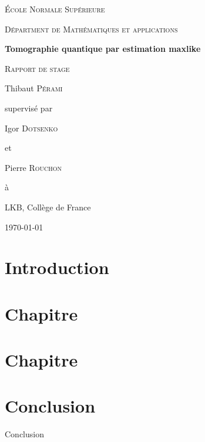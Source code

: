 \documentclass[10pt]{report}
\begin{document}
\begin{titlepage}
  \centering
  {\scshape\huge École Normale Supérieure \par}
  \vspace{0.3cm}
  {\scshape\Large Départment de Mathématiques et applications \par}
  \vspace{3cm}
  {\Huge\bfseries Tomographie quantique par estimation maxlike \par}
  \vspace{0.5cm}
  {\scshape\Large Rapport de stage\par}
  \vspace{3cm}
  {\LARGE Thibaut \textsc{Pérami}\par}
  \vfill
  {
    \large
    supervisé par\par
    Igor \textsc{Dotsenko}\par
    et\par
    Pierre \textsc{Rouchon}\par
  à\par
  LKB, Collège de France
  }

  \vfill

  {\Large \today\par}
\end{titlepage}

\newcommand{\fset}{\ensuremath{\mathop{\text{\textquotesingle}}}}


\tableofcontents

\chapter*{Introduction}

\chapter{Chapitre}

\chapter{Chapitre}

\chapter*{Conclusion} %

Conclusion
\end{document}
